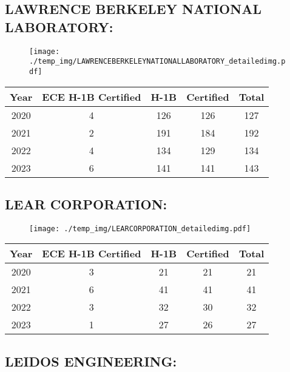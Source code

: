\documentclass{article}%
\begin{document}
%
\newpage%
\subsection{LAWRENCE BERKELEY NATIONAL LABORATORY:}%
\label{subsec:LAWRENCEBERKELEYNATIONALLABORATORY}%
\label{LAWRENCEBERKELEYNATIONALLABORATORYdetailed}%


\begin{figure}[htbp]%
\centering%
\texttt{[image: ./temp\_img/LAWRENCEBERKELEYNATIONALLABORATORY\_detailedimg.pdf]}%
\end{figure}

%
\begin{longtable}{c|c|c|c|c}%
\hline%
Year&ECE H{-}1B Certified&H{-}1B&Certified&Total\\%
\hline%
2020&4&126&126&127\\%
\hline%
2021&2&191&184&192\\%
\hline%
2022&4&134&129&134\\%
\hline%
2023&6&141&141&143\\%
\hline%
\end{longtable}

%
\newpage%
\subsection{LEAR CORPORATION:}%
\label{subsec:LEARCORPORATION}%
\label{LEARCORPORATIONdetailed}%


\begin{figure}[htbp]%
\centering%
\texttt{[image: ./temp\_img/LEARCORPORATION\_detailedimg.pdf]}%
\end{figure}

%
\begin{longtable}{c|c|c|c|c}%
\hline%
Year&ECE H{-}1B Certified&H{-}1B&Certified&Total\\%
\hline%
2020&3&21&21&21\\%
\hline%
2021&6&41&41&41\\%
\hline%
2022&3&32&30&32\\%
\hline%
2023&1&27&26&27\\%
\hline%
\end{longtable}

%
\newpage%
\subsection{LEIDOS ENGINEERING:}%
\label{subsec:LEIDOSENGINEERING}%
\label{LEIDOSENGINEERINGdetailed}%
\end{document}
